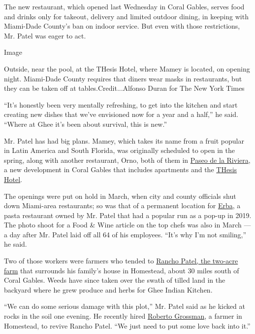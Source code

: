 The new restaurant, which opened last Wednesday in Coral Gables, serves
food and drinks only for takeout, delivery and limited outdoor dining,
in keeping with Miami-Dade County's ban on indoor service. But even with
those restrictions, Mr. Patel was eager to act.

Image

Outside, near the pool, at the THesis Hotel, where Mamey is located, on
opening night. Miami-Dade County requires that diners wear masks in
restaurants, but they can be taken off at tables.Credit...Alfonso Duran
for The New York Times

``It's honestly been very mentally refreshing, to get into the kitchen
and start creating new dishes that we've envisioned now for a year and a
half,'' he said. ``Where at Ghee it's been about survival, this is
new.''

Mr. Patel has had big plans. Mamey, which takes its name from a fruit
popular in Latin America and South Florida, was originally scheduled to
open in the spring, along with another restaurant, Orno, both of them in
\href{https://www.paseodelariviera.com/}{Paseo de la Riviera}, a new
development in Coral Gables that includes apartments and the
\href{https://www.paseodelariviera.com/thesis-hotel/}{THesis Hotel}.

The openings were put on hold in March, when city and county officials
shut down Miami-area restaurants; so was that of a permanent location
for
\href{https://www.miamiherald.com/miami-com/restaurants/article236003993.html}{Erba},
a pasta restaurant owned by Mr. Patel that had a popular run as a pop-up
in 2019. The photo shoot for a Food \& Wine article on the top chefs was
also in March --- a day after Mr. Patel laid off all 64 of his
employees. ``It's why I'm not smiling,'' he said.

Two of those workers were farmers who tended to
\href{https://www.nytimes3xbfgragh.onion/2017/08/14/dining/florida-chef-niven-patel-backyard-farm.html}{Rancho
Patel, the two-acre farm} that surrounds his family's house in
Homestead, about 30 miles south of Coral Gables. Weeds have since taken
over the swath of tilled land in the backyard where he grew produce and
herbs for Ghee Indian Kitchen.

``We can do some serious damage with this plot,'' Mr. Patel said as he
kicked at rocks in the soil one evening. He recently hired
\href{https://www.tinyfarmmiami.com/}{Roberto Grossman}, a farmer in
Homestead, to revive Rancho Patel. ``We just need to put some love back
into it.''


